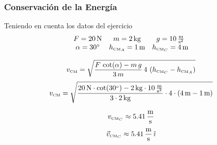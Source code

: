 \documentclass[a4paper]{beamer}
\newcommand{\tcm}{\ensuremath\text{\tiny CM}}
\newcommand{\uveci}{\hat{\imath}}
\begin{document}
\begin{frame}
	\frametitle{Conservación de la Energía}
	Teniendo en cuenta los datos del ejercicio
	$$ \begin{array}{c c c}
			F = \qty{20}{\newton} & m = \qty{2}{\kilo\gram} & g = \qty[per-mode=fraction]{10}{\meter\per\second\squared} \\ \alpha = \qty{30}{\degree} & h_{\tcm_A} = \qty{1}{\meter} & h_{\tcm_C} = \qty{4}{\meter}
		\end{array} $$

	$$ v_{\tcm} = \sqrt{\frac{F\, \cot(\alpha) - m\,g}{3\,m}\,4\,\left(h_{\tcm_C} - h_{\tcm_A} \right)} $$
	$$ v_{\tcm} = \sqrt{\frac{\qty{20}{\newton}\cdot \cot(\qty{30}{\degree}) - \qty{2}{\kilo\gram}\cdot\qty[per-mode=fraction]{10}{\meter\per\second\squared}}{3\cdot\qty{2}{\kilo\gram}}\cdot4\cdot\left(\qty{4}{\meter} - \qty{1}{\meter}\right)}$$

	$$ v_{\tcm_C} \approx \qty[per-mode = fraction]{5.41}{\meter\per\second} $$
	$$ \vec{v}_{\tcm_C} \approx \qty[per-mode = fraction]{5.41}{\meter\per\second} \, \uveci $$

\end{frame}
\end{document}
